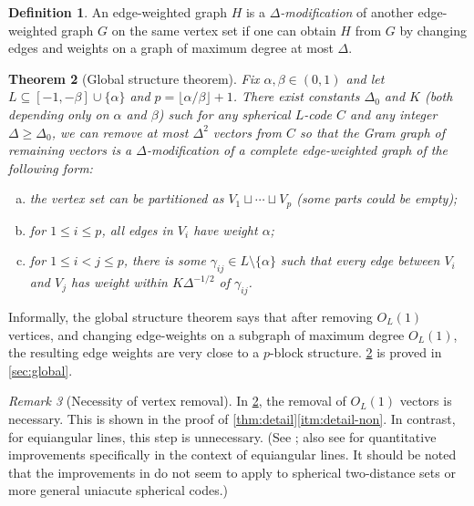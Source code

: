 \documentclass[reqno, 11pt]{amsart}
\newtheorem{theorem}{Theorem}[section]
\theoremstyle{definition}
\newtheorem{definition}[theorem]{Definition}
\theoremstyle{remark}
\newtheorem{remark}[theorem]{Remark}
\begin{document}
\begin{definition}
    An edge-weighted graph $H$ is a \textit{$\Delta$-modification} of another edge-weighted graph $G$ on the same vertex set if one can obtain $H$ from $G$ by changing edges and weights on a graph of maximum degree at most $\Delta$.
\end{definition}


\begin{theorem}[Global structure theorem]\label{thm:structure}
Fix $ \alpha, \beta \in (0,1)$ and let $L \subseteq [-1,-\beta]\cup\{\alpha\}$ and $p = \lfloor \alpha/ \beta \rfloor + 1$. There exist constants $\Delta_0$ and $K$ (both depending only on $\alpha$ and $\beta$) such for any spherical $L$-code $C$ and any integer $\Delta \geq \Delta_0$, we can remove at most $\Delta^2$ vectors from $C$ so that the Gram graph of remaining vectors is a $\Delta$-modification of a complete edge-weighted graph of the following form:
\begin{enumerate}[(a)]
	\item the vertex set can be partitioned as $V_1 \sqcup \cdots \sqcup V_p$ (some parts could be empty);
	\item for $1 \leq i \leq p$, all edges in $V_i$ have weight $\alpha$;
	\item for $1 \leq i  < j \leq p$, there is some $\gamma_{ij} \in L \setminus \{\alpha\}$ such that every edge between $V_i$ and $V_j$ has weight within $K \Delta^{-1/2}$ of $\gamma_{ij}$. \end{enumerate}
\end{theorem}

Informally, the global structure theorem says that after removing $O_L(1)$ vertices, and changing edge-weights on a subgraph of maximum degree $O_L(1)$, the resulting edge weights are very close to a $p$-block structure. \cref{thm:structure} is proved in \cref{sec:global}.

\begin{remark}[Necessity of vertex removal]
In \cref{thm:structure}, the removal of $O_L(1)$ vectors is necessary.
This is shown in the proof of \cref{thm:detail}\ref{itm:detail-non}.
In contrast, for equiangular lines, this step is unnecessary. (See \cite[Theorem 2.1]{JTYZZ21}; also see \cite{Bal21+} for quantitative improvements specifically in the context of equiangular lines. It should be noted that the improvements in \cite{Bal21+} do not seem to apply to spherical two-distance sets or more general uniacute spherical codes.)
\end{remark}
\end{document}
